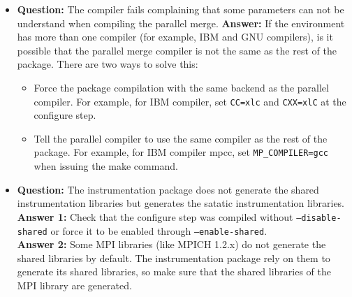 \begin{itemize}
\item {\bf Question:} The compiler fails complaining that some parameters can not be understand when compiling the parallel merge.
      {\bf Answer:  } If the environment has more than one compiler (for example, IBM and GNU compilers), is it possible that the parallel merge compiler is not the same as the rest of the package. There are two ways to solve this:
      \begin{itemize}
      \item Force the package compilation with the same backend as the parallel compiler. For example, for IBM compiler, set {\tt CC=xlc} and {\tt CXX=xlC} at the configure step.
      \item Tell the parallel compiler to use the same compiler as the rest of the package. For example, for IBM compiler mpcc, set {\tt MP\_COMPILER=gcc} when issuing the make command.
      \end{itemize}

\item {\bf Question:} The instrumentation package does not generate the shared instrumentation libraries but generates the satatic instrumentation libraries.\\
      {\bf Answer 1:} Check that the configure step was compiled without {\tt --disable-shared} or force it to be enabled through {\tt --enable-shared}.\\
      {\bf Answer 2:} Some MPI libraries (like MPICH 1.2.x) do not generate the shared libraries by default. The instrumentation package rely on them to generate its shared libraries, so make sure that the shared libraries of the MPI library are generated.


\end{itemize}
